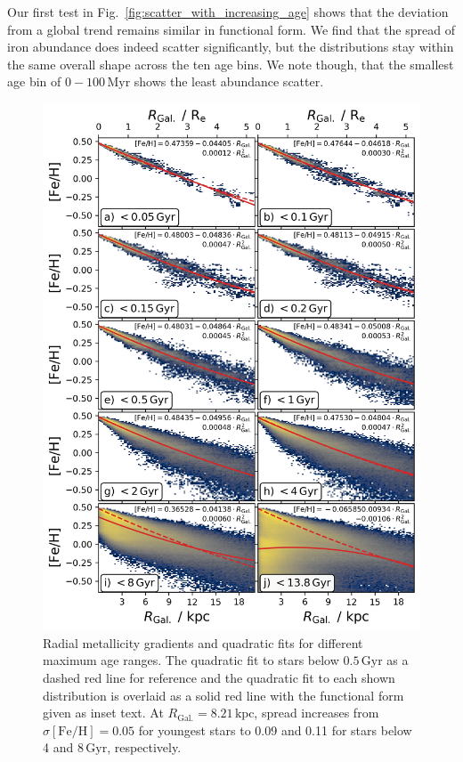 \documentclass[fleqn,usenatbib]{mnras}
\begin{document}
Our first test in Fig.~\ref{fig:scatter_with_increasing_age} shows that the deviation from a global trend remains similar in functional form. We find that the spread of iron abundance does indeed scatter significantly, but the distributions stay within the same overall shape across the ten age bins. We note though, that the smallest age bin of $0-100\,\mathrm{Myr}$ shows the least abundance scatter.

\begin{figure}
    \centering
    \includegraphics[width=\columnwidth]{figures/quadratic_fit_across_maximum_ages.png}
    \caption{Radial metallicity gradients and quadratic fits for different maximum age ranges. The quadratic fit to stars below $0.5\,\mathrm{Gyr}$ as a dashed red line for reference and the quadratic fit to each shown distribution is overlaid as a solid red line with the functional form given as inset text. At $R_\mathrm{Gal.}=8.21\,\mathrm{kpc}$, spread increases from $\sigma \mathrm{[Fe/H]} = 0.05$ for youngest stars to 0.09 and 0.11 for stars below 4 and $8\,\mathrm{Gyr}$, respectively.}
    \label{fig:quadratic_fit_across_maximum_ages}
\end{figure}
\end{document}
